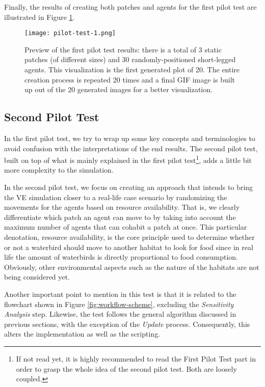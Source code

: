 Finally, the results of creating both patches and agents for the first pilot test are illustrated in Figure \ref{fig:pilot-test-1}.

\begin{figure}[h!]
    \centering
    \texttt{[image: pilot-test-1.png]}
    \caption{Preview of the first pilot test results: there is a total of 3 static patches (of different sizes) and 30 randomly-positioned short-legged agents. This visualization is the first generated plot of 20. The entire creation process is repeated 20 times and a final GIF image is built up out of the 20 generated images for a better visualization.}
    \label{fig:pilot-test-1}
\end{figure}

\subsection{Second Pilot Test}
In the first pilot test, we try to wrap up some key concepts and terminologies to avoid confusion with the interpretations of the end results. The second pilot test, built on top of what is mainly explained in the first pilot test\footnote{If not read yet, it is highly recommended to read the First Pilot Test part in order to grasp the whole idea of the second pilot test. Both are loosely coupled.}, adds a little bit more complexity to the simulation.

In the second pilot test, we focus on creating an approach that intends to bring the VE simulation closer to a real-life case scenario by randomizing the movements for the agents based on resource availability. That is, we clearly differentiate which patch an agent can move to by taking into account the maximum number of agents that can cohabit a patch at once. This particular denotation, resource availability, is the core principle used to determine whether or not a waterbird should move to another habitat to look for food since in real life the amount of waterbirds is directly proportional to food consumption. Obviously, other environmental aspects such as the nature of the habitats are not being considered yet.

Another important point to mention in this test is that it is related to the flowchart shown in Figure \ref{fig:workflow-scheme}, excluding the \emph{Sensitivity Analysis} step. Likewise, the test follows the general algorithm discussed in previous sections, with the exception of the \emph{Update} process. Consequently, this alters the implementation as well as the scripting.

